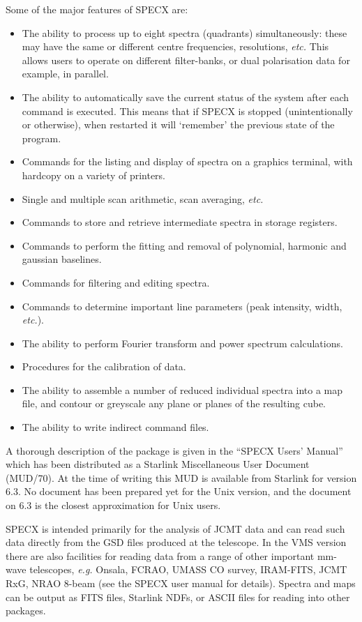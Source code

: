 \documentclass[twoside,11pt]{article}
\renewcommand{\_}{\texttt{\symbol{95}}}
\begin{document}
Some of the major features of SPECX are:
\begin{itemize}
\item
The ability to process up to eight spectra (quadrants) simultaneously:
these may have the same or different centre frequencies, resolutions, 
{\em etc.} This allows users to operate on different filter-banks, or
dual polarisation data for example, in parallel. 
\item
The ability to automatically save the current status of the system 
after each command is executed. This means that if SPECX is
stopped (unintentionally or otherwise), when restarted it will
`remember' the previous state of the program.
\item
Commands for the listing and display of spectra on a graphics
terminal, with hardcopy on a variety of printers.
\item
Single and multiple scan arithmetic, scan averaging, {\em etc.}
\item
Commands to store and retrieve intermediate spectra in storage registers.
\item
Commands to perform the fitting and removal of polynomial, 
harmonic and gaussian baselines.
\item
Commands for filtering and editing spectra.
\item
Commands to determine important line parameters (peak intensity, width, 
{\em etc.}).
\item
The ability to perform Fourier transform and power spectrum calculations.
\item
Procedures for the calibration of data.
\item
The ability to assemble a number of reduced individual spectra into a 
map file, and contour or greyscale any plane or planes of the resulting cube.
\item
The ability to write indirect command files.
\end{itemize}

A thorough description of the package is given in the ``SPECX Users' Manual''
which has been distributed as a Starlink Miscellaneous User Document
(MUD/70). At the time of writing this MUD is available from Starlink for
version 6.3. No document has been prepared yet for the Unix
version, and the document on 6.3 is the closest approximation for Unix
users.

SPECX is intended primarily for the analysis of JCMT data and can read such
data directly from the GSD files produced at the telescope.  In the VMS
version there are also facilities for reading data from a range of other
important mm-wave telescopes, {\em e.g.} Onsala, FCRAO, UMASS CO survey,
IRAM-FITS, JCMT RxG, NRAO 8-beam (see the SPECX user manual for details).
Spectra and maps can be output as FITS files, Starlink NDFs, or ASCII files
for reading into other packages.
\end{document}
